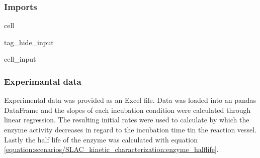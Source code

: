 \documentclass[letterpaper,10pt,english]{jupyterBook}
\begin{document}
\subsubsection{Imports}
\label{\detokenize{scenarios/enzyme_inactivation:imports}}
\begin{sphinxuseclass}{cell}
\begin{sphinxuseclass}{tag_hide_input}\begin{sphinxVerbatimInput}

\begin{sphinxuseclass}{cell_input}
\begin{sphinxVerbatim}[commandchars=\\\{\}]
   
   
   
   
   
   
   
   



 
\end{sphinxVerbatim}

\end{sphinxuseclass}\end{sphinxVerbatimInput}

\end{sphinxuseclass}
\end{sphinxuseclass}

\subsubsection{Experimantal data}
\label{\detokenize{scenarios/enzyme_inactivation:id1}}
\sphinxAtStartPar
Experimental data was provided as an Excel file. Data was loaded into an pandas DataFrame and the slopes of each incubation condition were calculated through linear regression. The resulting initial rates were used to calculate by which the enzyme activity decreases in regard to the incubation time tin the reaction vessel. Lastly the half life of the enzyme was calculated with equation \eqref{equation:scenarios/SLAC_kinetic_characterization:enzyme_halflife}.
\end{document}
